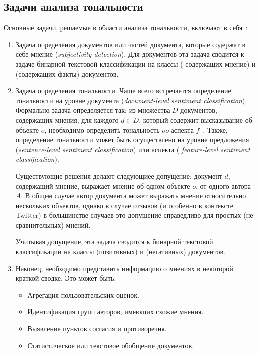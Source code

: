 \subsection{Задачи анализа тональности}

Основные задачи, решаемые в области анализа тональности, 
включают в себя~\cite{Pang2008}:
\begin{enumerate}


\item {
  Задача определения документов или частей документа, которые содержат в себе 
  мнение (\textit{subjectivity detection}). Для документов эта задача сводится к 
  задаче бинарной текстовой классификации на классы {} (
  содержащих мнение) и {} (содержащих факты) документов.
}

\item {
  Задача определения тональности. Чаще всего встречается определение 
  тональности на уровне документа (\textit{document-level sentiment classification}). 
  Формально задача определяется так: 
  из множества $D$ документов, содержащих мнения, для каждого $d \in D$, 
  который содержит высказывание об объекте $o$, необходимо определить 
  тональность $oo$ аспекта $f$~\cite{Liu2010a}. 
  Также, определение тональности может быть осуществлено на уровне 
  предложения (\textit{sentence-level sentiment classification}) или аспекта (\textit{
  feature-level sentiment classification}).

  Существующие решения делают следующиее допущение: документ $d$, 
  содержащий мнение, выражает мнение об одном объекте $o$, 
  от одного автора $A$. В общем случае автор документа может выражать мнение 
  относительно нескольких объектов, однако в случае отзывов (и особенно в 
  контексте Twitter) в большинстве случаев это допущение справедливо для 
  простых (не сравнительных) мнений.

  Учитывая допущение, эта задача сводится к бинарной текстовой классификации 
  на классы {} (позитивных) и {} (негативных) 
  документов.
}

\item {
  Наконец, необходимо представить информацию о мнениях в некоторой краткой 
  сводке. Это может быть:
  
  \begin{itemize}

  \item Агрегация пользовательских оценок.
  \item Идентификация групп авторов, имеющих схожие мнения.
  \item Выявление пунктов согласия и противоречия.
  \item Статистическое или текстовое обобщение документов.

  \end{itemize}
}

\end{enumerate}

